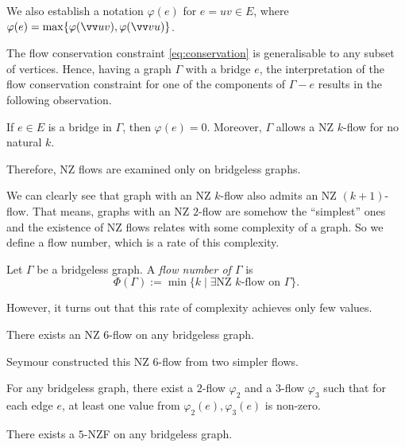 We also establish a notation $\varphi(e)$ for $e=uv\in E$, where $\varphi(e)=\max\{\varphi(\vv uv), \varphi(\vv vu)\}$.

The flow conservation constraint \eqref{eq:conservation} is generalisable to any subset of vertices. Hence, having a graph $\Gamma$ with a bridge $e$, the interpretation of the flow conservation constraint for one of the components of $\Gamma - e$ results in the following observation.

\begin{claim}
    If $e\in E$ is a bridge in $\Gamma$, then $\varphi(e)=0$. Moreover, $\Gamma$ allows a NZ $k$-flow for no natural $k$.
\end{claim}

Therefore, NZ flows are examined only on bridgeless graphs.

We can clearly see that graph with an NZ $k$-flow also admits an NZ $(k+1)$-flow. That means, graphs with an NZ $2$-flow are somehow the ``simplest'' ones and the existence of NZ flows relates with some complexity of a graph. So we define a flow number, which is a rate of this complexity. 

\begin{definition}
	Let $\Gamma$ be a bridgeless graph. A \emph{flow number of $\Gamma$} is
	\begin{equation*}
		\Phi(\Gamma) := \min\{k\mid\exists\text{NZ } k\text{-flow on }\Gamma\}.\label{eq:flow_number}
	\end{equation*}
\end{definition}

However, it turns out that this rate of complexity achieves only few values.

\begin{theorem} \emph{\cite[p. 133]{seymour}}
    There exists an NZ $6$-flow on any bridgeless graph.\label{th:6_flow}
\end{theorem}

Seymour constructed this NZ $6$-flow from two simpler flows.

\begin{lemma} \emph{\cite[p. 132]{seymour}}
    For any bridgeless graph, there exist a $2$-flow $\varphi_2$ and a $3$-flow $\varphi_3$ such that for each edge $e$, at least one value from $\varphi_2(e), \varphi_3(e)$ is non-zero.\label{lem:2_flow_3_flow_seymour}
\end{lemma}

\begin{conjecture} \emph{\cite[p. 83]{tutte}}
    There exists a $5$-NZF on any bridgeless graph.\label{conj:5_flow}
\end{conjecture}

